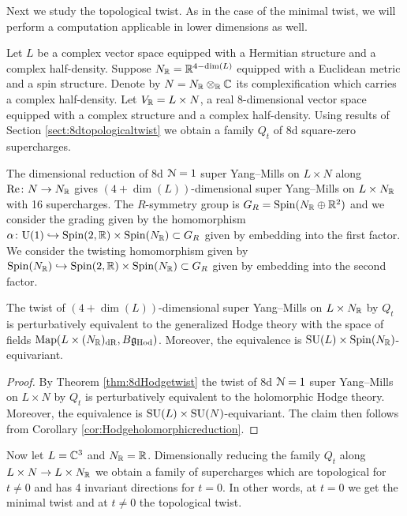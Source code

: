 \documentclass[10pt, oneside]{article}
\newcommand{\Hod}{\mathrm{Hod}}
\renewcommand{\Re}{\mathrm{Re}}
\renewcommand{\U}{\mathrm{U}}
\begin{document}
Next we study the topological twist. As in the case of the minimal twist, we will perform a computation applicable in lower dimensions as well.

Let $L$ be a complex vector space equipped with a Hermitian structure and a complex half-density. Suppose $N_\mathbb R = \mathbb R^{4-\dim(L)}$ equipped with a Euclidean metric and a spin structure. Denote by $N=N_\mathbb R\otimes_\mathbb R\mathbb C$ its complexification which carries a complex half-density. Let $V_\mathbb R=L\times N$, a real 8-dimensional vector space equipped with a complex structure and a complex half-density. Using results of Section \ref{sect:8dtopologicaltwist} we obtain a family $Q_t$ of 8d square-zero supercharges.

The dimensional reduction of 8d $\mathcal N=1$ super Yang--Mills on $L\times N$ along $\Re\colon N\rightarrow N_\RR$ gives $(4+\dim(L))$-dimensional super Yang--Mills on $L\times N_\mathbb R$ with 16 supercharges. The $R$-symmetry group is $G_R=\mathrm{Spin}(N_\mathbb R\oplus \mathbb R^2)$ and we consider the grading given by the homomorphism $\alpha\colon\U(1)\hookrightarrow \Spin(2, \RR)\times \Spin(N_\RR)\subset G_R$ given by embedding into the first factor. We consider the twisting homomorphism given by $\mathrm{Spin}(N_\mathbb R)\hookrightarrow \mathrm{Spin}(2, \mathbb R)\times \mathrm{Spin}(N_\mathbb R)\subset G_R$ given by embedding into the second factor.

\begin{theorem}
The twist of $(4+\dim(L))$-dimensional super Yang--Mills on $L\times N_\mathbb R$ by $Q_t$ is perturbatively equivalent to the generalized Hodge theory with the space of fields $\map(L\times (N_\RR)_{\mr{dR}}, B\fg_\Hod)$. Moreover, the equivalence is $\mathrm{SU}(L)\times \mathrm{Spin}(N_\mathbb R)$-equivariant.
\label{thm:8dHodgereduction}
\end{theorem}
\begin{proof}
By Theorem \ref{thm:8dHodgetwist} the twist of 8d $\mathcal N=1$ super Yang--Mills on $L\times N$ by $Q_t$ is perturbatively equivalent to the holomorphic Hodge theory. Moreover, the equivalence is $\mathrm{SU}(L)\times \mathrm{SU}(N)$-equivariant. The claim then follows from Corollary \ref{cor:Hodgeholomorphicreduction}.
\end{proof}

Now let $L=\mathbb C^3$ and $N_\mathbb R=\mathbb R$. Dimensionally reducing the family $Q_t$ along $L\times N\rightarrow L\times N_\mathbb R$ we obtain a family of supercharges which are topological for $t\neq 0$ and has 4 invariant directions for $t=0$. In other words, at $t=0$ we get the minimal twist and at $t\neq 0$ the topological twist.
\end{document}
